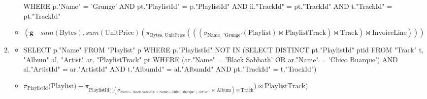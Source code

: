 \documentclass[10pt]{article}
\begin{document}
\begin{enumerate}[label=\arabic*.]
\begin{itemize}
    WHERE p."Name" = 'Grunge' AND pt."PlaylistId" = p."PlaylistId" AND il."TrackId" = pt."TrackId" AND t."TrackId" = pt."TrackId"\\
    \item
    $(\textbf{g}\quad sum(\text{Bytes}), sum(\text{UnitPrice})(\pi_{\text{Bytes, UnitPrice}}(((\sigma_{\text{Name='Grunge'}}(\text{Playlist}) \bowtie \text{PlaylistTrack}) \bowtie \text{Track}) \bowtie \text{InvoiceLine})))$
    \end{itemize}
  \item
  	\begin{itemize}
    \item
    SELECT p."Name" FROM "Playlist" p
    WHERE p."PlaylistId" NOT IN (SELECT DISTINCT pt."PlaylistId" ptid FROM "Track" t, "Album" al, "Artist" ar, "PlaylistTrack" pt
    WHERE (ar."Name" = 'Black Sabbath' OR ar."Name" = 'Chico Buarque') AND al."ArtistId" = ar."ArtistId" AND t."AlbumId" = al."AlbumId" AND pt."TrackId" = t."TrackId")
    \item
    $\pi_{\text{PlaylistId}}\text{(Playlist}) - \pi_{\text{PlaylistId}(((\sigma_{\text{Name='Black Sabbath'} \vee \text{Name='Chico Buarque'}(Artist)} \bowtie \text{Album}) \bowtie \text{Track}}) \bowtie \text{PlaylistTrack})$
    \end{itemize}
\end{enumerate}
\end{document}
